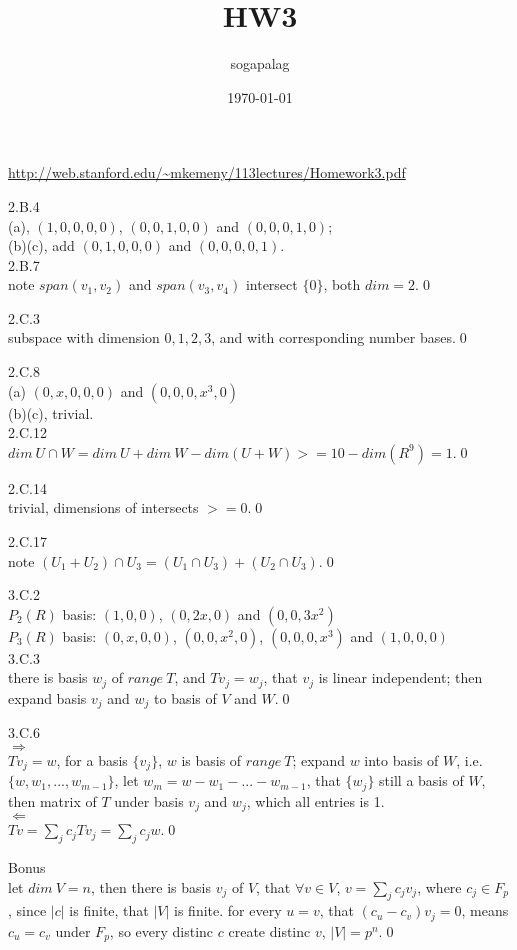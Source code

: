 \documentclass[paper=a4, fontsize=11pt]{scrartcl} %
\title{HW3}
\author{sogapalag}
\date{\normalsize\today}
\numberwithin{equation}{section} %
\numberwithin{figure}{section} %
\numberwithin{table}{section} %
\begin{document}
\maketitle 
\url{http://web.stanford.edu/~mkemeny/113lectures/Homework3.pdf}

2.B.4\\
(a), $(1, 0, 0, 0,0)$, $(0,0,1,0,0)$ and $(0,0,0,1,0)$;\\
(b)(c), add $(0, 1, 0, 0,0)$ and $(0, 0, 0, 0,1)$.\\
2.B.7\\
note $span(v_1, v_2) $ and $span(v_3, v_4)$ intersect $\{0\}$, both $dim = 2$.\qed

2.C.3\\
subspace with dimension $0,1,2,3$, and with corresponding number bases.\qed

2.C.8\\
(a) $(0,x,0,0,0)$ and $(0,0,0,x^3,0)$\\
(b)(c), trivial.\\
2.C.12\\
$dim\ U\cap W = dim\ U +dim\ W - dim(U+W) >= 10- dim(R^9) = 1$.\qed

2.C.14\\
trivial, dimensions of intersects $>=0$.\qed

2.C.17\\
note $(U_1 +U_2)\cap U_3 = (U_1\cap U_3) + (U_2\cap U_3)$.\qed

3.C.2\\
$P_2(R)$ basis: $(1,0,0)$, $(0,2x,0)$ and $(0,0,3x^2)$\\
$P_3(R)$ basis: $(0,x,0,0)$, $(0,0,x^2,0)$, $(0,0,0,x^3)$ and $(1,0,0,0)$\\

3.C.3\\
there is basis $w_j$ of $range\ T$, and $Tv_j = w_j$, that $v_j$ is linear independent; then expand basis $v_j$ and $w_j$ to basis of $V$ and $W$.\qed

3.C.6\\
$\Rightarrow$\\
$Tv_j=w$, for a basis $\{v_j\}$, $w$ is basis of $range\ T$; expand $w$ into basis of $W$, i.e. $\{w, w_1,...,w_{m-1}\}$, let $w_m = w-w_1-...-w_{m-1}$, that $\{w_j\}$ still a basis of $W$, then matrix of $T$ under basis $v_j$ and $w_j$, which all entries is 1.\\
$\Leftarrow$\\
$Tv = \sum_j c_jTv_j = \sum_j c_j w$.\qed

Bonus\\
let $dim\ V = n$, then there is basis $v_j$ of $V$, that $\forall v\in V$, $v= \sum_j c_j v_j$, where $c_j\in F_p$, since $|c|$ is finite, that $|V|$ is finite. for every $u=v$, that $(c_u-c_v) v_j = 0$, means $c_u=c_v$ under $F_p$, so every distinc $c$ create distinc $v$, $|V| = p^n$.\qed 
\end{document}
